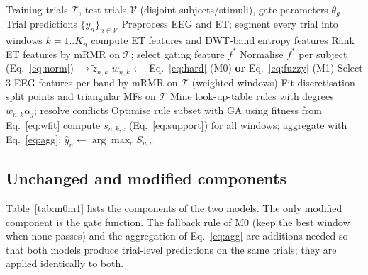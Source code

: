\documentclass[11pt,a4paper]{article}
\begin{document}
\begin{algorithm}[t]
\caption{Fuzzy-gated S-FIS-GA emotion recognition (one CV fold)}\label{alg:m1}
\small
\begin{algorithmic}[1]
\Require Training trials $\mathcal{T}$, test trials $\mathcal{V}$ (disjoint subjects/stimuli), gate parameters $\theta_g$
\Ensure Trial predictions $\{\hat y_n\}_{n\in\mathcal{V}}$
\State Preprocess EEG and ET; segment every trial into windows $k=1..K_n$
 compute ET features and DWT-band entropy features \EndFor
\State Rank ET features by mRMR on $\mathcal{T}$; select gating feature $f^\ast$
\State Normalise $f^\ast$ per subject (Eq.~\ref{eq:norm}) $\rightarrow \tilde z_{n,k}$
\State $w_{n,k}\gets$ Eq.~\eqref{eq:hard} (M0) \textbf{or} Eq.~\eqref{eq:fuzzy} (M1)
\State Select 3 EEG features per band by mRMR on $\mathcal{T}$ (weighted windows)
\State Fit discretisation split points and triangular MFs on $\mathcal{T}$
\State Mine look-up-table rules with degrees $w_{n,k}\alpha_j$; resolve conflicts
\State Optimise rule subset with GA using fitness from Eq.~\eqref{eq:wfit}
  \State compute $s_{n,k,c}$ (Eq.~\ref{eq:support}) for all windows; aggregate with Eq.~\eqref{eq:agg}; $\hat y_n\gets\arg\max_c S_{n,c}$
\EndFor
\end{algorithmic}
\end{algorithm}

\subsection{Unchanged and modified components}
Table~\ref{tab:m0m1} lists the components of the two models. The only modified component is the gate function. The fallback rule of M0 (keep the best window when none passes) and the aggregation of Eq.~\eqref{eq:agg} are additions needed so that both models produce trial-level predictions on the same trials; they are applied identically to both.
\end{document}
